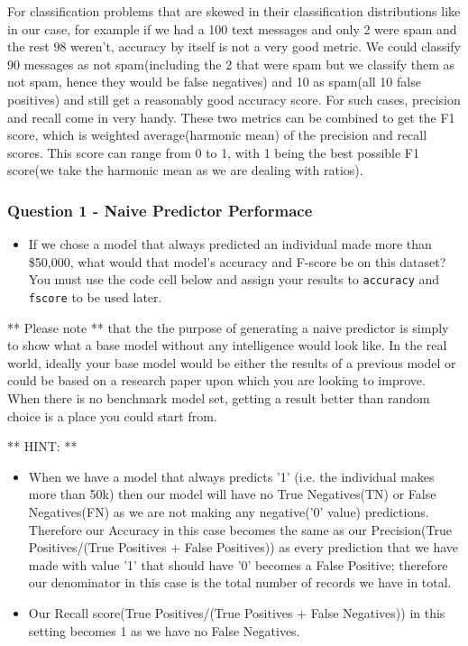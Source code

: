 \documentclass[11pt]{article}
\providecommand{\tightlist}{%
      \setlength{\itemsep}{0pt}\setlength{\parskip}{0pt}}
\begin{document}
For classification problems that are skewed in their classification
distributions like in our case, for example if we had a 100 text
messages and only 2 were spam and the rest 98 weren't, accuracy by
itself is not a very good metric. We could classify 90 messages as not
spam(including the 2 that were spam but we classify them as not spam,
hence they would be false negatives) and 10 as spam(all 10 false
positives) and still get a reasonably good accuracy score. For such
cases, precision and recall come in very handy. These two metrics can be
combined to get the F1 score, which is weighted average(harmonic mean)
of the precision and recall scores. This score can range from 0 to 1,
with 1 being the best possible F1 score(we take the harmonic mean as we
are dealing with ratios).

    \subsubsection{Question 1 - Naive Predictor
Performace}\label{question-1---naive-predictor-performace}

\begin{itemize}
\tightlist
\item
  If we chose a model that always predicted an individual made more than
  \$50,000, what would that model's accuracy and F-score be on this
  dataset? You must use the code cell below and assign your results to
  \texttt{\textquotesingle{}accuracy\textquotesingle{}} and
  \texttt{\textquotesingle{}fscore\textquotesingle{}} to be used later.
\end{itemize}

** Please note ** that the the purpose of generating a naive predictor
is simply to show what a base model without any intelligence would look
like. In the real world, ideally your base model would be either the
results of a previous model or could be based on a research paper upon
which you are looking to improve. When there is no benchmark model set,
getting a result better than random choice is a place you could start
from.

** HINT: **

\begin{itemize}
\tightlist
\item
  When we have a model that always predicts '1' (i.e. the individual
  makes more than 50k) then our model will have no True Negatives(TN) or
  False Negatives(FN) as we are not making any negative('0' value)
  predictions. Therefore our Accuracy in this case becomes the same as
  our Precision(True Positives/(True Positives + False Positives)) as
  every prediction that we have made with value '1' that should have '0'
  becomes a False Positive; therefore our denominator in this case is
  the total number of records we have in total.
\item
  Our Recall score(True Positives/(True Positives + False Negatives)) in
  this setting becomes 1 as we have no False Negatives.
\end{itemize}
\end{document}
